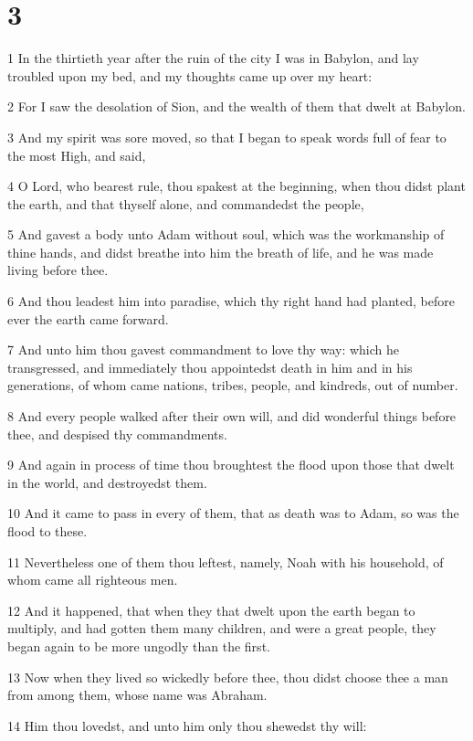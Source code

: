 \chapter{3}

\par 1 In the thirtieth year after the ruin of the city I was in Babylon, and lay troubled upon my bed, and my thoughts came up over my heart:
\par 2 For I saw the desolation of Sion, and the wealth of them that dwelt at Babylon.
\par 3 And my spirit was sore moved, so that I began to speak words full of fear to the most High, and said,
\par 4 O Lord, who bearest rule, thou spakest at the beginning, when thou didst plant the earth, and that thyself alone, and commandedst the people,
\par 5 And gavest a body unto Adam without soul, which was the workmanship of thine hands, and didst breathe into him the breath of life, and he was made living before thee.
\par 6 And thou leadest him into paradise, which thy right hand had planted, before ever the earth came forward.
\par 7 And unto him thou gavest commandment to love thy way: which he transgressed, and immediately thou appointedst death in him and in his generations, of whom came nations, tribes, people, and kindreds, out of number.
\par 8 And every people walked after their own will, and did wonderful things before thee, and despised thy commandments.
\par 9 And again in process of time thou broughtest the flood upon those that dwelt in the world, and destroyedst them.
\par 10 And it came to pass in every of them, that as death was to Adam, so was the flood to these.
\par 11 Nevertheless one of them thou leftest, namely, Noah with his household, of whom came all righteous men.
\par 12 And it happened, that when they that dwelt upon the earth began to multiply, and had gotten them many children, and were a great people, they began again to be more ungodly than the first.
\par 13 Now when they lived so wickedly before thee, thou didst choose thee a man from among them, whose name was Abraham.
\par 14 Him thou lovedst, and unto him only thou shewedst thy will:
